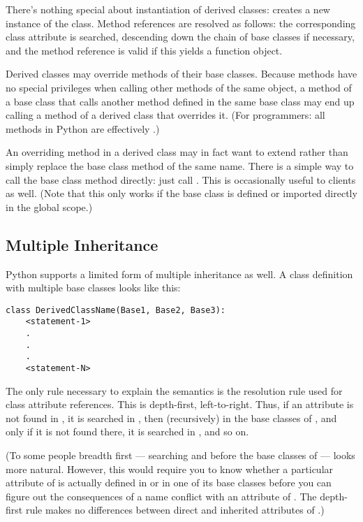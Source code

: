 \documentclass{manual}
\begin{document}
There's nothing special about instantiation of derived classes:
 creates a new instance of the class.  Method
references are resolved as follows: the corresponding class attribute
is searched, descending down the chain of base classes if necessary,
and the method reference is valid if this yields a function object.

Derived classes may override methods of their base classes.  Because
methods have no special privileges when calling other methods of the
same object, a method of a base class that calls another method
defined in the same base class may end up calling a method of
a derived class that overrides it.  (For \Cpp{} programmers: all methods
in Python are effectively .)

An overriding method in a derived class may in fact want to extend
rather than simply replace the base class method of the same name.
There is a simple way to call the base class method directly: just
call .  This is
occasionally useful to clients as well.  (Note that this only works if
the base class is defined or imported directly in the global scope.)


\subsection{Multiple Inheritance \label{multiple}}

Python supports a limited form of multiple inheritance as well.  A
class definition with multiple base classes looks like this:

\begin{verbatim}
class DerivedClassName(Base1, Base2, Base3):
    <statement-1>
    .
    .
    .
    <statement-N>
\end{verbatim}

The only rule necessary to explain the semantics is the resolution
rule used for class attribute references.  This is depth-first,
left-to-right.  Thus, if an attribute is not found in
, it is searched in , then
(recursively) in the base classes of , and only if it is
not found there, it is searched in , and so on.

(To some people breadth first --- searching  and
 before the base classes of  --- looks more
natural.  However, this would require you to know whether a particular
attribute of  is actually defined in  or in
one of its base classes before you can figure out the consequences of
a name conflict with an attribute of .  The depth-first
rule makes no differences between direct and inherited attributes of
.)
\end{document}
